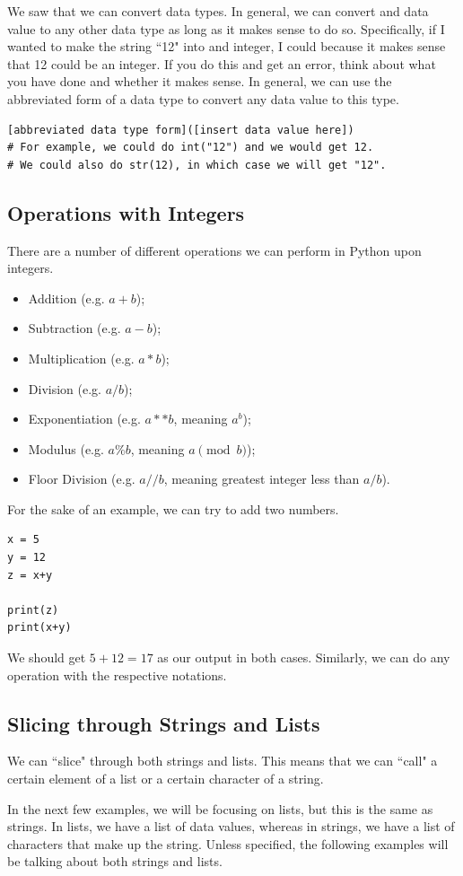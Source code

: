 \documentclass{article}
\begin{document}
We saw that we can convert data types. In general, we can convert and data value to any other data type as long as it makes sense to do so. Specifically, if I wanted to make the string ``12" into and integer, I could because it makes sense that 12 could be an integer. If you do this and get an error, think about what you have done and whether it makes sense. In general, we can use the abbreviated form of a data type to convert any data value to this type. 
\begin{lstlisting}
[abbreviated data type form]([insert data value here]) 
# For example, we could do int("12") and we would get 12.
# We could also do str(12), in which case we will get "12".
\end{lstlisting}
\subsection{Operations with Integers}
There are a number of different operations we can perform in Python upon integers. 
\begin{itemize}
    \item Addition (e.g. $a+b$);
    \item Subtraction (e.g. $a-b$);
    \item Multiplication (e.g. $a*b$);
    \item Division (e.g. $a/b$);
    \item Exponentiation (e.g. $a**b$, meaning $a^{b}$);
    \item Modulus (e.g. $a\%b$, meaning $a\pmod{b}$);
    \item Floor Division (e.g. $a//b$, meaning greatest integer less than $a/b$).
\end{itemize}

For the sake of an example, we can try to add two numbers.
\begin{lstlisting}
x = 5
y = 12
z = x+y

print(z)
print(x+y) 
\end{lstlisting}
We should get $5+12=17$ as our output in both cases. Similarly, we can do any operation with the respective notations. 
\subsection{Slicing through Strings and Lists}
We can ``slice" through both strings and lists. This means that we can ``call" a certain element of a list or a certain character of a string. 

In the next few examples, we will be focusing on lists, but this is the same as strings. In lists, we have a list of data values, whereas in strings, we have a list of characters that make up the string. Unless specified, the following examples will be talking about both strings and lists.
\end{document}
